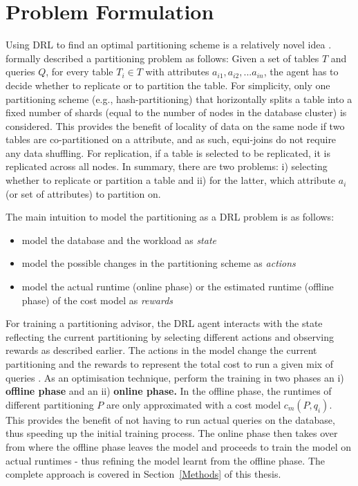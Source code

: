 \section{Problem Formulation}
Using DRL to find an optimal partitioning scheme is a relatively novel idea \cite{Hilprecht:2019:TLP:3329859.3329876, DBLP:conf/sigmod/DurandPPMBSSRB18}. \citeauthor{Hilprecht:2019:TLP:3329859.3329876} formally described a partitioning problem as follows: Given a set of tables $T$ and queries $Q$, for every table $T_i \in T$ with attributes $a_{i1}, a_{i2}, ...a_{in}$, the agent has to decide whether to replicate or to partition the table. For simplicity, only one partitioning scheme (e.g., hash-partitioning) that horizontally splits a table into a fixed number of shards (equal to the number of nodes in the database cluster) is considered. This provides the benefit of locality of data on the same node if two tables are co-partitioned on a attribute, and as such, equi-joins do not require any data shuffling. For replication, if a table is selected to be replicated, it is replicated across all nodes. In summary, there are two problems: i) selecting whether to replicate or partition a table and ii) for the latter, which attribute $a_i$ (or set of attributes) to partition on. 

The main intuition to model the partitioning as a DRL problem is as follows:
\begin{itemize}
    \item model the database and the workload as \textit{state}
    \item model the possible changes in the partitioning scheme as \textit{actions}
    \item model the actual runtime (online phase) or the estimated runtime (offline phase) of the cost model as \textit{rewards}
\end{itemize}

For training a partitioning advisor, the DRL agent interacts with the state reflecting the current partitioning by selecting different actions and observing rewards as described earlier. The actions in the model change the current partitioning and the rewards to represent the total cost to run a given mix of queries \cite{Hilprecht:2019:TLP:3329859.3329876, DBLP:conf/sigmod/HilprechtBR20}. 
As an optimisation technique, \citeauthor{Hilprecht:2019:TLP:3329859.3329876} perform the training in two phases an i) \textbf{offline phase} and an ii) \textbf{online phase.} In the offline phase, the runtimes of different partitioning $P$ are only approximated with a cost model $c_m(P,q_i)$. This provides the benefit of not having to run actual queries on the database, thus speeding up the initial training process. The online phase then takes over from where the offline phase leaves the model and proceeds to train the model on actual runtimes - thus refining the model learnt from the offline phase. The complete approach is covered in Section~\ref{Methods} of this thesis.

